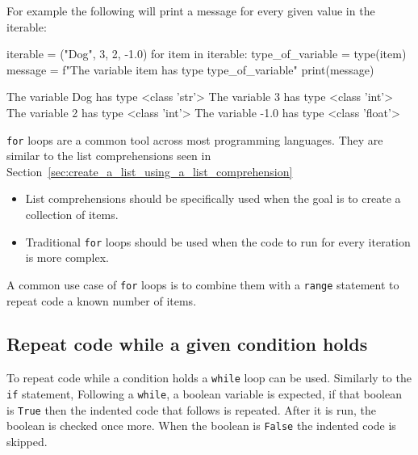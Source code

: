 For example the following will print a message for every given value in the
iterable:




\begin{pyin}
iterable = ("Dog", 3, 2, -1.0)
for item in iterable:
    type_of_variable = type(item)
    message = f"The variable {item} has type {type_of_variable}"
    print(message)
\end{pyin}





\begin{raw}
The variable Dog has type <class 'str'>
The variable 3 has type <class 'int'>
The variable 2 has type <class 'int'>
The variable -1.0 has type <class 'float'>
\end{raw}


\begin{note}
\texttt{for} loops are a common tool across most programming languages. They are
similar to the list comprehensions seen in
Section~\ref{sec:create_a_list_using_a_list_comprehension}
\begin{itemize}
\item 

List comprehensions should be
specifically used when the goal is to create a collection of items.

\item 

Traditional \texttt{for} loops should be used when the code to run for every
iteration is more complex.

\end{itemize}
\end{note}



\begin{note}
A common
use case of \texttt{for} loops is to combine them with a \texttt{range} statement to repeat
code a known number of items.
\end{note}



\subsection{Repeat code \textbf{while} a given condition holds}

To repeat code while a condition holds a \texttt{while} loop can be used. Similarly to
the \texttt{if} statement, Following a \texttt{while}, a boolean
variable is expected, if that boolean is \texttt{True} then the indented code that
follows is repeated. After it is run, the boolean is checked once more. When the
boolean is \texttt{False} the indented code is skipped.


